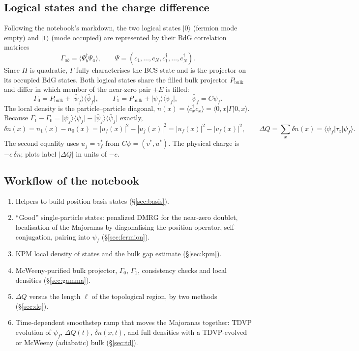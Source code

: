 \documentclass[11pt]{article}
\newcommand{\ket}[1]{\lvert #1\rangle}
\newcommand{\bra}[1]{\langle #1\rvert}
\begin{document}
\subsection{Logical states and the charge difference}

Following the notebook's markdown, the two logical states $\ket{0}$ (fermion mode empty) and $\ket{1}$ (mode
occupied) are represented by their BdG correlation matrices
\[
  \Gamma_{ab} = \langle \Psi_b^\dagger \Psi_a\rangle, \qquad
  \Psi = (c_1,\dots,c_N, c_1^\dagger,\dots,c_N^\dagger).
\]
Since $H$ is quadratic, $\Gamma$ fully characterises the BCS state and is the projector on its occupied BdG states.
Both logical states share the filled bulk projector $P_{\text{bulk}}$ and differ in which member of the near-zero
pair $\pm E$ is filled:
\[
  \Gamma_0 = P_{\text{bulk}} + \ket{\bar\psi_f}\bra{\bar\psi_f}, \qquad
  \Gamma_1 = P_{\text{bulk}} + \ket{\psi_f}\bra{\psi_f}, \qquad \bar\psi_f = C\psi_f .
\]
The local density is the particle--particle diagonal, $n(x)=\langle c_x^\dagger c_x\rangle = \langle 0,x\vert\Gamma\vert 0,x\rangle$.
Because $\Gamma_1-\Gamma_0 = \ket{\psi_f}\bra{\psi_f} - \ket{\bar\psi_f}\bra{\bar\psi_f}$ exactly,
\begin{equation}\label{eq:dq}
  \delta n(x) = n_1(x)-n_0(x) = |u_f(x)|^2 - |u_{\bar f}(x)|^2 = |u_f(x)|^2-|v_f(x)|^2,
  \qquad
  \Delta Q = \sum_x \delta n(x) = \bra{\psi_f}\tau_z\ket{\psi_f}.
\end{equation}
The second equality uses $u_{\bar f} = v_f^*$ from $C\psi=(v^*,u^*)$. The physical charge is $-e\,\delta n$;
plots label $|\Delta Q|$ in units of $-e$.

\subsection{Workflow of the notebook}
\begin{enumerate}
\item Helpers to build position basis states (\S\ref{sec:basis}).
\item ``Good'' single-particle states: penalized DMRG for the near-zero doublet, localisation of the Majoranas by
      diagonalising the position operator, self-conjugation, pairing into $\psi_f$ (\S\ref{sec:fermion}).
\item KPM local density of states and the bulk gap estimate  (\S\ref{sec:kpm}).
\item McWeeny-purified bulk projector, $\Gamma_0$, $\Gamma_1$, consistency checks and local densities (\S\ref{sec:gamma}).
\item $\Delta Q$ versus the length $\ell$ of the topological region, by two methods (\S\ref{sec:dq}).
\item Time-dependent smoothstep ramp that moves the Majoranas together: TDVP evolution of $\psi_f$, $\Delta Q(t)$,
      $\delta n(x,t)$, and full densities with a TDVP-evolved or McWeeny (adiabatic) bulk (\S\ref{sec:td}).
\end{enumerate}
\end{document}
